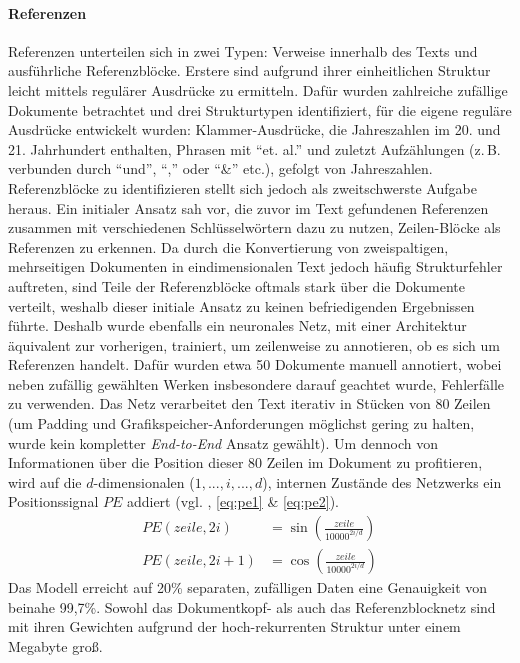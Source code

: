 \documentclass[bachelor,german]{info1thesis}
\begin{document}
\paragraph{Referenzen} Referenzen unterteilen sich in zwei Typen: Verweise innerhalb des Texts und ausführliche Referenzblöcke. Erstere sind aufgrund ihrer einheitlichen Struktur leicht mittels regulärer Ausdrücke zu ermitteln. Dafür wurden zahlreiche zufällige Dokumente betrachtet und drei Strukturtypen identifiziert, für die eigene reguläre Ausdrücke entwickelt wurden: Klammer-Ausdrücke, die Jahreszahlen im 20. und 21. Jahrhundert enthalten, Phrasen mit ``et. al.'' und zuletzt Aufzählungen (z.\,B. verbunden durch ``und'', ``,'' oder ``\&'' etc.), gefolgt von Jahreszahlen. \\
Referenzblöcke zu identifizieren stellt sich jedoch als zweitschwerste Aufgabe heraus. Ein initialer Ansatz sah vor, die zuvor im Text gefundenen Referenzen zusammen mit verschiedenen Schlüsselwörtern dazu zu nutzen, Zeilen-Blöcke als Referenzen zu erkennen. Da durch die Konvertierung von zweispaltigen, mehrseitigen Dokumenten in eindimensionalen Text jedoch häufig Strukturfehler auftreten, sind Teile der Referenzblöcke oftmals stark über die Dokumente verteilt, weshalb dieser initiale Ansatz zu keinen befriedigenden Ergebnissen führte. Deshalb wurde ebenfalls ein neuronales Netz, mit einer Architektur äquivalent zur vorherigen, trainiert, um zeilenweise zu annotieren, ob es sich um Referenzen handelt. Dafür wurden etwa 50 Dokumente manuell annotiert, wobei neben zufällig gewählten Werken insbesondere darauf geachtet wurde, Fehlerfälle zu verwenden. Das Netz verarbeitet den Text iterativ in Stücken von 80 Zeilen (um Padding und Grafikspeicher-Anforderungen möglichst gering zu halten, wurde kein kompletter \textit{End-to-End} Ansatz gewählt). Um dennoch von Informationen über die Position dieser 80 Zeilen im Dokument zu profitieren, wird auf die $d$-dimensionalen ($1, ..., i, ..., d$), internen Zustände des Netzwerks ein Positionssignal $PE$ addiert (vgl. \cite{Vaswani2017}, \autoref{eq:pe1} \& \ref{eq:pe2}).
\begin{align}
PE(zeile, 2i) &= \sin\left(\frac{zeile}{10000^{2i / d}}\right) \label{eq:pe1} \\ \label{eq:pe2}
PE(zeile, 2i+1) &= \cos\left(\frac{zeile}{10000^{2i / d}}\right)
\end{align}
Das Modell erreicht auf 20\% separaten, zufälligen Daten eine Genauigkeit von beinahe 99,7\%.
Sowohl das Dokumentkopf- als auch das Referenzblocknetz sind mit ihren Gewichten aufgrund der hoch-rekurrenten Struktur unter einem Megabyte groß.
\end{document}
